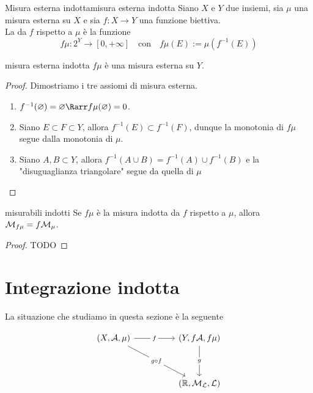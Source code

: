 \documentclass{article}
\begin{document}
\begin{definition}{Misura esterna indotta}{misura esterna indotta}
    Siano $X$ e $Y$ due insiemi, sia $\mu$ una misura esterna su $X$ e sia $f:X\to Y$ una funzione biettiva.\\
    La  da $f$ rispetto a $\mu$ è la funzione
    \[f\mu : 2^Y \to [0,+\infty] \quad \text{con} \quad f\mu(E):= \mu(f^{-1}(E)) \]
\end{definition}
\begin{proposition}{}{misura esterna indotta}
    $f\mu$ è una misura esterna su $Y$.
    \begin{proof}
        Dimostriamo i tre assiomi di misura esterna.\begin{enumerate}
            \item $f^{-1}(\varnothing) = \varnothing \Rarr f\mu(\varnothing) = 0$.
            \item Siano $E \subset F \subset Y$, allora $f^{-1}(E)\subset f^{-1}(F)$, dunque la monotonia di $f\mu$ segue dalla monotonia di $\mu$.
            \item Siano $A,B \subset Y$, allora $f^{-1}(A\cup B)= f^{-1}(A) \cup f^{-1}(B) $ e la "disuguaglianza triangolare" segue da quella di $\mu$
        \end{enumerate}
    \end{proof}
\end{proposition}
\begin{proposition}{}{misurabili indotti}
    Se $f\mu$ è la misura indotta da $f$ rispetto a $\mu$, allora $\mathcal{M}_{f\mu} = f \mathcal{M}_\mu$.
    \begin{proof}
        TODO
    \end{proof}
\end{proposition}

\section{Integrazione indotta}

La situazione che studiamo in questa sezione è la seguente

\[\begin{tikzcd}
	{(X,\mc{A},\mu)} && {(Y,f\mc{A},f\mu)} \\
	\\
	&& {(\R,\M_\L,\L)}
	\arrow["f"{description}, from=1-1, to=1-3]
	\arrow["{g \circ f}"{description}, from=1-1, to=3-3]
	\arrow["g"{description}, from=1-3, to=3-3]
\end{tikzcd}\]
\end{document}
